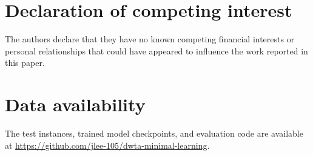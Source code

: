 \documentclass[preprint,12pt]{elsarticle}
\begin{document}
\section*{Declaration of competing interest}
The authors declare that they have no known competing financial interests or
personal relationships that could have appeared to influence the work
reported in this paper.

\section*{Data availability}
The test instances, trained model checkpoints, and evaluation code are
available at \url{https://github.com/jlee-105/dwta-minimal-learning}.




\appendix


\end{document}
